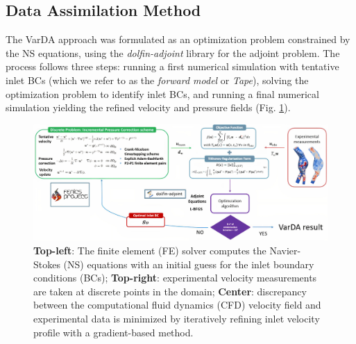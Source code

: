 \subsection*{Data Assimilation Method}
The VarDA approach was formulated as an optimization problem constrained by the NS equations, using the \emph{dolfin-adjoint} library for the adjoint problem. The process follows three steps: running a first numerical simulation with tentative inlet BCs (which we refer to as the \emph{forward model} or \emph{Tape}), solving the optimization problem to identify inlet BCs, and running a final numerical simulation yielding the refined velocity and pressure fields (Fig. \ref{fig:scheme}).

\begin{figure}
    \centering
    \includegraphics[width=\textwidth]{chapters/chp1/graphics/schema2_upscaled4.jpg}
    \caption{\small \textbf{Top-left}: The finite element (FE) solver computes the Navier-Stokes (NS) equations with an initial guess for the inlet boundary conditions (BCs); \textbf{Top-right}: experimental velocity measurements are taken at discrete points in the domain; \textbf{Center}: discrepancy between the computational fluid dynamics (CFD) velocity field and experimental data is minimized by iteratively refining inlet velocity profile with a gradient-based method.}
    \label{fig:scheme}
\end{figure}



